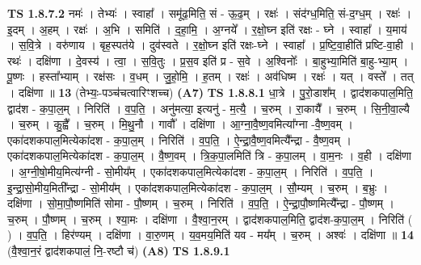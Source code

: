 \documentclass[17pt]{extarticle}
\begin{document}
                  \newline
                                \textbf{ TS 1.8.7.2} \newline
                  नमः॑ । तेभ्यः॑ । स्वाहा᳚ । समू॑ढ॒मिति॒ सं - ऊ॒ढ॒म् । रक्षः॑ । संद॑ग्ध॒मिति॒ सं-द॒ग्ध॒म् । रक्षः॑ । इ॒दम् । अ॒हम् । रक्षः॑ । अ॒भि । समिति॑ । द॒हा॒मि॒ । अ॒ग्नये᳚ । र॒क्षो॒घ्न इति॑ रक्षः - घ्ने । स्वाहा᳚ । य॒माय॑ । स॒वि॒त्रे । वरु॑णाय । बृह॒स्पत॑ये । दुव॑स्वते । र॒क्षो॒घ्न इति॑ रक्षः-घ्ने । स्वाहा᳚ । प्र॒ष्टि॒वा॒हीति॑ प्रष्टि-वा॒ही । रथः॑ । दक्षि॑णा । दे॒वस्य॑ । त्वा॒ । स॒वि॒तुः । प्र॒स॒व इति॑ प्र - स॒वे । अ॒श्विनोः᳚ । बा॒हुभ्या॒मिति॑ बा॒हु-भ्या॒म् । पू॒ष्णः । हस्ता᳚भ्याम् । रक्ष॑सः । व॒धम् । जु॒हो॒मि॒ । ह॒तम् । रक्षः॑ । अव॑धिष्म । रक्षः॑ । यत् । वस्ते᳚ । तत् । दक्षि॑णा ॥ \textbf{  13 } \newline
                  \newline
                      (तेभ्यः॒-पञ्च॑चत्वारिꣳशच्च)  \textbf{(A7)} \newline \newline
                                \textbf{ TS 1.8.8.1} \newline
                  धा॒त्रे । पु॒रो॒डाश᳚म् । द्वाद॑शकपाल॒मिति॒ द्वाद॑श - क॒पा॒ल॒म् । निरिति॑ । व॒प॒ति॒ । अनु॑मत्या॒ इत्यनु॑ - म॒त्यै॒ । च॒रुम् । रा॒कायै᳚ । च॒रुम् । सि॒नी॒वा॒ल्यै । च॒रुम् । कु॒ह्वै᳚ । च॒रुम् । मि॒थु॒नौ । गावौ᳚ । दक्षि॑णा । आ॒ग्ना॒वै॒ष्ण॒वमित्या᳚ग्ना -वै॒ष्ण॒वम् । एका॑दशकपाल॒मित्येका॑दश - क॒पा॒ल॒म् । निरिति॑ । व॒प॒ति॒ । ऐ॒न्द्रा॒वै॒ष्ण॒वमित्यै᳚न्द्रा - वै॒ष्ण॒वम् । एका॑दशकपाल॒मित्येका॑दश - क॒पा॒ल॒म् । वै॒ष्ण॒वम् । त्रि॒क॒पा॒लमिति॑ त्रि - क॒पा॒लम् । वा॒म॒नः । व॒ही । दक्षि॑णा । अ॒ग्नी॒षो॒मीय॒मित्य॑ग्नी - सो॒मीय᳚म् । एका॑दशकपाल॒मित्येका॑दश - क॒पा॒ल॒म् । निरिति॑ । व॒प॒ति॒ । इ॒न्द्रा॒सो॒मीय॒मिती᳚न्द्रा - सो॒मीय᳚म् । एका॑दशकपाल॒मित्येका॑दश - क॒पा॒ल॒म् । सौ॒म्यम् । च॒रुम् । ब॒भ्रुः । दक्षि॑णा । सो॒मा॒पौ॒ष्णमिति॑ सोमा - पौ॒ष्णम् । च॒रुम् । निरिति॑ । व॒प॒ति॒ । ऐ॒न्द्रा॒पौ॒ष्णमित्यै᳚न्द्रा - पौ॒ष्णम् । च॒रुम् । पौ॒ष्णम् । च॒रुम् । श्या॒मः । दक्षि॑णा । वै॒श्वा॒न॒रम् । द्वाद॑शकपाल॒मिति॒ द्वाद॑श-क॒पा॒ल॒म् । निरिति॑ ( ) । व॒प॒ति॒ । हिर॑ण्यम् । दक्षि॑णा । वा॒रु॒णम् । य॒व॒मय॒मिति॑ यव - मय᳚म् । च॒रुम् । अश्वः॑ । दक्षि॑णा ॥ \textbf{  14} \newline
                  \newline
                      (वै॒श्वा॒न॒रं द्वाद॑शकपालं॒ नि॒-रष्टौ च॑)  \textbf{(A8)} \newline \newline
                                \textbf{ TS 1.8.9.1} \newline
\end{document}

